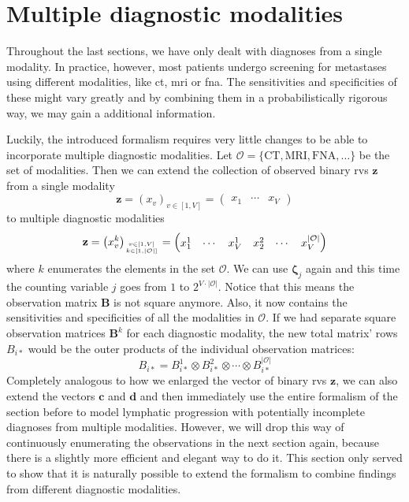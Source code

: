 \documentclass[\relativeRoot/main.tex]{subfiles}
\begin{document}
\section{Multiple diagnostic modalities}
\label{sec:unilateral:multimodality}

Throughout the last sections, we have only dealt with diagnoses from a single modality. In practice, however, most patients undergo screening for metastases using different modalities, like \gls{ct}, \gls{mri} or \gls{fna}. The sensitivities and specificities of these might vary greatly and by combining them in a probabilistically rigorous way, we may gain a additional information.

Luckily, the introduced formalism requires very little changes to be able to incorporate multiple diagnostic modalities. Let $\mathcal{O} = \{ \text{CT}, \text{MRI}, \text{FNA}, \ldots \}$ be the set of modalities. Then we can extend the collection of observed binary \glspl{rv} $\mathbf{z}$ from a single modality
%
\begin{equation}
    \mathbf{z} = \left( x_v \right)_{v \in [1,V]} =
    \begin{pmatrix}
        x_1 & \cdots & x_V
    \end{pmatrix}
\end{equation}
%
to multiple diagnostic modalities
%
\begin{equation}
    \mathbf{z} = \left( x_v^k \right)_{v \in [1,V] \atop k \in [1, |\mathcal{O}|]} =
    \begin{pmatrix}
        x_1^1 & \cdots & x_V^1 & x_2^2 & \cdots & x_V^{|\mathcal{O}|}
    \end{pmatrix}
\end{equation}
%
where $k$ enumerates the elements in the set $\mathcal{O}$. We can use $\boldsymbol{\zeta}_j$ again and this time the counting variable $j$ goes from $1$ to $2^{V \cdot |\mathcal{O}|}$. Notice that this means the observation matrix $\mathbf{B}$ is not square anymore. Also, it now contains the sensitivities and specificities of all the modalities in $\mathcal{O}$. If we had separate square observation matrices $\mathbf{B}^k$ for each diagnostic modality, the new total matrix' rows $B_{i*}$ would be the outer products of the individual observation matrices:
%
\begin{equation}
    B_{i*} = B_{i*}^1 \otimes B_{i*}^2 \otimes \cdots \otimes B_{i*}^{|\mathcal{O}|}
\end{equation}
%
Completely analogous to how we enlarged the vector of binary \glspl{rv} $\mathbf{z}$, we can also extend the vectors $\mathbf{c}$ and $\mathbf{d}$ and then immediately use the entire formalism of the section before to model lymphatic progression with potentially incomplete diagnoses from multiple modalities. However, we will drop this way of continuously enumerating the observations in the next section again, because there is a slightly more efficient and elegant way to do it. This section only served to show that it is naturally possible to extend the formalism to combine findings from different diagnostic modalities.
\end{document}
